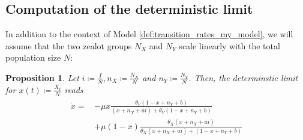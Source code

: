 \documentclass[12pt,a4paper,twoside]{article}
\newtheorem{prop}{Proposition}[section]
\begin{document}
\subsection{Computation of the deterministic limit}\label{subsec:det_lim_comp}
In addition to the context of Model \ref{def:transition_rates_my_model}, we will assume that the two zealot groups $N_X$ and $N_Y$ scale linearly with the total population size $N$:
\begin{prop}\label{prop:det_limit_my_model}
	Let $i \coloneqq \frac{I}{N}, n_X \coloneqq \frac{N_X}{N}$ and $n_Y \coloneqq \frac{N_Y}{N}$. Then, the determinstic limit for $x\left(t\right) \coloneqq \frac{X_t}{N}$ reads
	\begin{align*}
	\begin{split}
	\dot{x} = &-\mu x\frac{\theta_Y(1-x+n_Y+b)}{(x+n_X+ai) + \theta_Y(1-x+n_Y+b)}\\
	\qquad&+ \mu \left(1-x\right)\frac{\theta_X (x+ n_X+ ai)}{\theta_X (x + n_X + ai) + (1-x + n_Y + b)}
	\end{split}
	\end{align*}
\end{prop}
\end{document}
